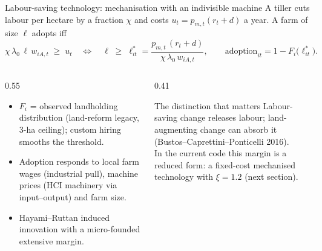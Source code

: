 \documentclass[10pt,aspectratio=169]{beamer}
\newcommand{\hl}[1]{\textcolor{mOrange}{#1}}
\begin{document}
\begin{frame}{Labour-saving technology: mechanisation with an indivisible machine}
  A tiller cuts labour per hectare by a fraction $\chi$ and costs $u_t=p_{m,t}(r_t+d)$ a
  year. A farm of size $\ell$ adopts iff
  \begin{equation*}
    \chi\,\lambda_0\,\ell\,w_{iA,t}\;\ge\;u_t
    \quad\Longleftrightarrow\quad
    \ell\;\ge\;\ell^{*}_{it}=\frac{p_{m,t}\,(r_t+d)}{\chi\,\lambda_0\,w_{iA,t}},
    \qquad
    \text{adoption}_{it}=1-F_i\bigl(\ell^{*}_{it}\bigr).
  \end{equation*}
  \begin{columns}[T]
    \begin{column}{0.55\textwidth}
      \small
      \begin{itemize}
        \item $F_i$ = \hl{observed} landholding distribution (land-reform legacy, 3-ha
              ceiling); custom hiring smooths the threshold.
        \item Adoption responds to local farm wages (\hl{industrial pull}), machine prices
              (\hl{HCI machinery} via input--output) and farm size.
        \item Hayami--Ruttan induced innovation with a micro-founded extensive margin.
      \end{itemize}
    \end{column}
    \begin{column}{0.41\textwidth}
      \begin{block}{The distinction that matters}
        \small
        Labour-saving change \hl{releases} labour; land-augmenting change can
        \hl{absorb} it (Bustos--Caprettini--Ponticelli 2016).\\[0.3em]
        In the current code this margin is a reduced form: a fixed-cost
        mechanised technology with $\xi=1.2$ (next section).
      \end{block}
    \end{column}
  \end{columns}
\end{frame}
\end{document}
